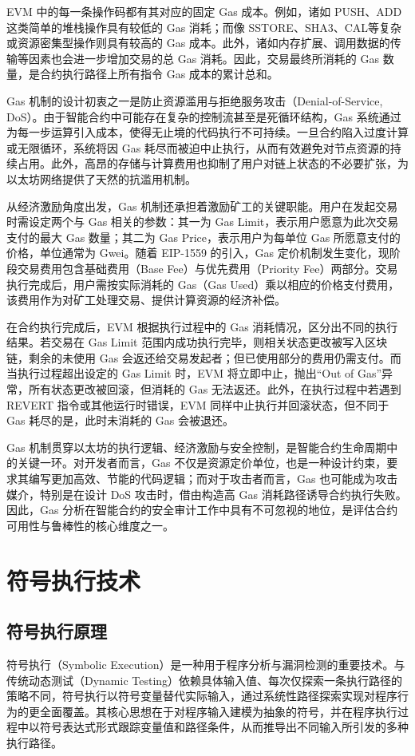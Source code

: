 \documentclass[print, master, vlined, timesmath]{DissertUESTC}
\begin{document}
EVM 中的每一条操作码都有其对应的固定 Gas 成本。例如，诸如 PUSH、ADD 这类简单的堆栈操作具有较低的 Gas 消耗；而像 SSTORE、SHA3、CAL等复杂或资源密集型操作则具有较高的 Gas 成本。此外，诸如内存扩展、调用数据的传输等因素也会进一步增加交易的总 Gas 消耗。因此，交易最终所消耗的 Gas 数量，是合约执行路径上所有指令 Gas 成本的累计总和。

Gas 机制的设计初衷之一是防止资源滥用与拒绝服务攻击（Denial-of-Service, DoS）。由于智能合约中可能存在复杂的控制流甚至是死循环结构，Gas 系统通过为每一步运算引入成本，使得无止境的代码执行不可持续。一旦合约陷入过度计算或无限循环，系统将因 Gas 耗尽而被迫中止执行，从而有效避免对节点资源的持续占用。此外，高昂的存储与计算费用也抑制了用户对链上状态的不必要扩张，为以太坊网络提供了天然的抗滥用机制。

从经济激励角度出发，Gas 机制还承担着激励矿工的关键职能。用户在发起交易时需设定两个与 Gas 相关的参数：其一为 Gas Limit，表示用户愿意为此次交易支付的最大 Gas 数量；其二为 Gas Price，表示用户为每单位 Gas 所愿意支付的价格，单位通常为 Gwei。随着 EIP-1559 的引入，Gas 定价机制发生变化，现阶段交易费用包含基础费用（Base Fee）与优先费用（Priority Fee）两部分。交易执行完成后，用户需按实际消耗的 Gas（Gas Used）乘以相应的价格支付费用，该费用作为对矿工处理交易、提供计算资源的经济补偿。

在合约执行完成后，EVM 根据执行过程中的 Gas 消耗情况，区分出不同的执行结果。若交易在 Gas Limit 范围内成功执行完毕，则相关状态更改被写入区块链，剩余的未使用 Gas 会返还给交易发起者；但已使用部分的费用仍需支付。而当执行过程超出设定的 Gas Limit 时，EVM 将立即中止，抛出“Out of Gas”异常，所有状态更改被回滚，但消耗的 Gas 无法返还。此外，在执行过程中若遇到 REVERT 指令或其他运行时错误，EVM 同样中止执行并回滚状态，但不同于 Gas 耗尽的是，此时未消耗的 Gas 会被退还。

Gas 机制贯穿以太坊的执行逻辑、经济激励与安全控制，是智能合约生命周期中的关键一环。对开发者而言，Gas 不仅是资源定价单位，也是一种设计约束，要求其编写更加高效、节能的代码逻辑；而对于攻击者而言，Gas 也可能成为攻击媒介，特别是在设计 DoS 攻击时，借由构造高 Gas 消耗路径诱导合约执行失败。因此，Gas 分析在智能合约的安全审计工作中具有不可忽视的地位，是评估合约可用性与鲁棒性的核心维度之一。




\section{符号执行技术}

\subsection{符号执行原理}
符号执行（Symbolic Execution）是一种用于程序分析与漏洞检测的重要技术。与传统动态测试（Dynamic Testing）依赖具体输入值、每次仅探索一条执行路径的策略不同，符号执行以符号变量替代实际输入，通过系统性路径探索实现对程序行为的更全面覆盖。其核心思想在于对程序输入建模为抽象的符号，并在程序执行过程中以符号表达式形式跟踪变量值和路径条件，从而推导出不同输入所引发的多种执行路径。
\end{document}
